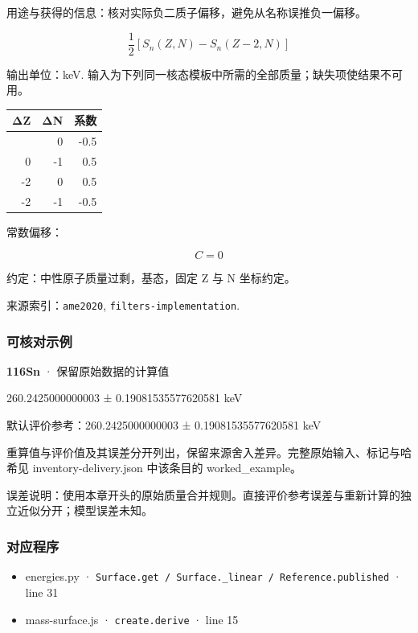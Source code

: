 \documentclass[
  11pt,
  letterpaper,
]{article}
\providecommand{\tightlist}{%
  \setlength{\itemsep}{0pt}\setlength{\parskip}{0pt}}
\begin{document}
用途与获得的信息：核对实际负二质子偏移，避免从名称误推负一偏移。

\[
\frac12[S_n(Z,N)-S_n(Z-2,N)]
\]

输出单位：keV.
输入为下列同一核态模板中所需的全部质量；缺失项使结果不可用。

\begin{longtable}[]{@{}rrr@{}}
\toprule\noalign{}
ΔZ & ΔN & 系数 \\
\midrule\noalign{}
\endhead
\bottomrule\noalign{}
\endlastfoot
0 & 0 & -0.5 \\
0 & -1 & 0.5 \\
-2 & 0 & 0.5 \\
-2 & -1 & -0.5 \\
\end{longtable}

常数偏移：

\[
C=0
\]

约定：中性原子质量过剩，基态，固定 Z 与 N 坐标约定。

来源索引：\texttt{ame2020}, \texttt{filters-implementation}.

\subsubsection{可核对示例}\label{ux53efux6838ux5bf9ux793aux4f8b-35}

\textbf{116Sn} · 保留原始数据的计算值

260.2425000000003 ± 0.19081535577620581 keV

默认评价参考：260.2425000000003 ± 0.19081535577620581 keV

重算值与评价值及其误差分开列出，保留来源舍入差异。完整原始输入、标记与哈希见
inventory-delivery.json 中该条目的 worked\_example。

误差说明：使用本章开头的原始质量合并规则。直接评价参考误差与重新计算的独立近似分开；模型误差未知。

\subsubsection{对应程序}\label{ux5bf9ux5e94ux7a0bux5e8f-35}

\begin{itemize}
\tightlist
\item
  energies.py ·
  \texttt{Surface.get\ /\ Surface.\_linear\ /\ Reference.published} ·
  line 31
\item
  mass-surface.js · \texttt{create.derive} · line 15
\end{itemize}
\end{document}
